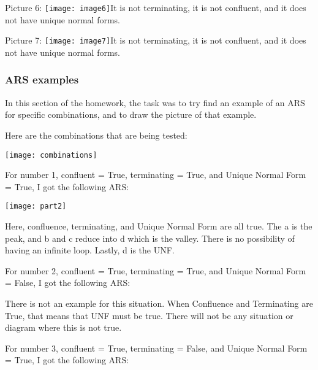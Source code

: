 \documentclass{article}
\theoremstyle{theorem}
\theoremstyle{definition}
\theoremstyle{remark}
\begin{document}
\noindent\newline\newline Picture 6:
\texttt{[image: image6]}\noindent\newline It is not terminating, it is not confluent, and it does not have unique normal forms.


\noindent\newline\newline Picture 7:
\texttt{[image: image7]}\noindent\newline It is not terminating, it is not confluent, and it does not have unique normal forms.


\subsubsection{ARS examples}
In this section of the homework, the task was to try find an example of an ARS for specific combinations, and to draw the picture of that example. 

Here are the combinations that are being tested:

\texttt{[image: combinations]}

\hrulefill

\noindent\newline For number 1, confluent = True, terminating = True, and Unique Normal Form = True, I got the following ARS:

\texttt{[image: part2]}

\noindent\newline Here, confluence, terminating, and Unique Normal Form are all true. The a is the peak, and b and c reduce into d which is the valley. There is no possibility of having an infinite loop. Lastly, d is the UNF.

\hrulefill

\noindent\newline\newline For number 2, confluent = True, terminating = True, and Unique Normal Form = False, I got the following ARS:


\noindent\newline There is not an example for this situation. When Confluence and Terminating are True, that means that UNF must be true. There will not be any situation or diagram where this is not true.

\hrulefill

\noindent\newline\newline For number 3, confluent = True, terminating = False, and Unique Normal Form = True, I got the following ARS:
\end{document}
